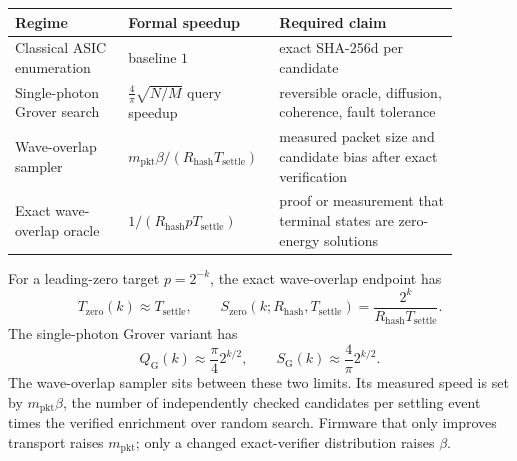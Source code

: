 \documentclass[11pt]{article}
\theoremstyle{definition}
\theoremstyle{remark}
\begin{document}
\begin{center}
\begin{minipage}{\linewidth}
\centering
\begin{tabular}{L{0.24\linewidth}L{0.26\linewidth}L{0.38\linewidth}}
\toprule
Regime & Formal speedup & Required claim\\
\midrule
Classical ASIC enumeration & baseline \(1\) & exact SHA-256d per candidate\\
Single-photon Grover search & \(\frac{4}{\pi}\sqrt{N/M}\) query speedup &
reversible oracle, diffusion, coherence, fault tolerance\\
Wave-overlap sampler & \(m_{\mathrm{pkt}}\beta/(R_{\mathrm{hash}}T_{\mathrm{settle}})\) &
measured packet size and candidate bias after exact verification\\
Exact wave-overlap oracle & \(1/(R_{\mathrm{hash}}pT_{\mathrm{settle}})\) &
proof or measurement that terminal states are zero-energy solutions\\
\bottomrule
\end{tabular}
\label{tab:speedups}
\end{minipage}
\end{center}

For a leading-zero target \(p=2^{-k}\), the exact wave-overlap endpoint has
\[
T_{\mathrm{zero}}(k)\approx T_{\mathrm{settle}},\qquad
S_{\mathrm{zero}}(k;R_{\mathrm{hash}},T_{\mathrm{settle}})
=\frac{2^k}{R_{\mathrm{hash}}T_{\mathrm{settle}}}.
\]
The single-photon Grover variant has
\[
Q_{\mathrm{G}}(k)\approx\frac{\pi}{4}2^{k/2},\qquad
S_{\mathrm{G}}(k)\approx\frac{4}{\pi}2^{k/2}.
\]
The wave-overlap sampler sits between these two limits. Its measured speed is
set by \(m_{\mathrm{pkt}}\beta\), the number of independently checked candidates per
settling event times the verified enrichment over random search. Firmware that
only improves transport raises \(m_{\mathrm{pkt}}\); only a changed
exact-verifier distribution raises \(\beta\).
\end{document}
